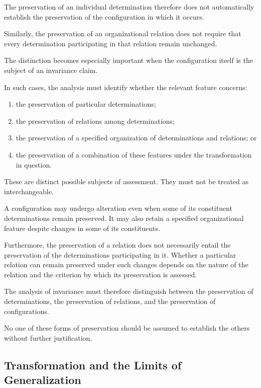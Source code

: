 The preservation of an individual determination
therefore does not automatically establish the
preservation of the configuration in which it occurs.

Similarly, the preservation of an organizational
relation does not require that every determination
participating in that relation remain unchanged.

The distinction becomes especially important when
the configuration itself is the subject of an
invariance claim.

In such cases, the analysis must identify whether
the relevant feature concerns:

\begin{enumerate}
    \item the preservation of particular determinations;
    \item the preservation of relations among determinations;
    \item the preservation of a specified organization
    of determinations and relations; or
    \item the preservation of a combination of these
    features under the transformation in question.
\end{enumerate}

These are distinct possible subjects of assessment.
They must not be treated as interchangeable.

A configuration may undergo alteration even when
some of its constituent determinations remain
preserved. It may also retain a specified organizational
feature despite changes in some of its constituents.

Furthermore, the preservation of a relation does
not necessarily entail the preservation of the
determinations participating in it. Whether a
particular relation can remain preserved under
such changes depends on the nature of the relation
and the criterion by which its preservation is assessed.

The analysis of invariance must therefore distinguish
between the preservation of determinations, the
preservation of relations, and the preservation
of configurations.

No one of these forms of preservation should be
assumed to establish the others without further
justification.

\subsection{Transformation and the Limits of Generalization}


